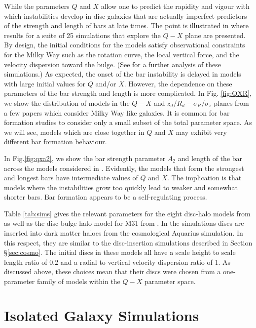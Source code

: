 While the parameters $Q$ and $X$ allow one to predict the rapidity and
vigour with which instabilities develop in disc galaxies that are
actually imperfect predictors of the strength and length of bars at
late times.  The point is illustrated in \citet{WPDGalactICSReference}
where results for a suite of 25 simulations that explore the $Q-X$
plane are presented.  By design, the initial conditions for the models
satisfy observational constraints for the Milky Way such as the
rotation curve, the local vertical force, and the velocity dispersion
toward the bulge.  (See \citet{hartmann2014} for a further analysis of
these simulations.)  As expected, the onset of the bar instability is
delayed in models with large initial values for $Q$ and/or $X$.
However, the dependence on these parameters of the bar strength and
length is more complicated.  {In Fig. \ref{fig:QXR}, we show the distribution
of models  in the $Q-X$ and $z_d/R_d-\sigma_R/\sigma_z$ planes from a few papers which
 consider Milky Way like galaxies.
It is common for bar formation studies to consider only a small subset
of the total parameter space. As we will see, models which are close together
in $Q$ and $X$ may exhibit very different bar formation behaviour.}

In Fig.\ref{fig:qxa2}, we show the bar
strength parameter $A_2$ and length of the bar { across the models considered
in \citet{WPDGalactICSReference}.}
Evidently, the models that form the strongest and longest bars have
intermediate values of $Q$ and $X$.  The implication is that models
where the instabilities grow too quickly lead to weaker and somewhat
shorter bars.  Bar formation appears to be a self-regulating process.

Table \ref{tab:sims} gives the relevant parameters for the eight
disc-halo models from \citet{YurinSpringelStellarDisks} as well as the
disc-bulge-halo model for M31 from \citet{gauthier2006}.  In the
\citet{YurinSpringelStellarDisks} simulations discs are inserted into
dark matter haloes from the cosmological Aquarius simulation.  In this
respect, they are similar to the disc-insertion simulations described
in Section \S \ref{sec:cosmo}.  The initial discs in these models all
have a scale height to scale length ratio of $0.2$ and a radial to
vertical velocity dispersion ratio of $1$.  As discussed above, these
choices mean that their discs were chosen from a one-parameter family
of models within the $Q-X$ parameter space.

\section{Isolated Galaxy Simulations}\label{sec:isolated}

